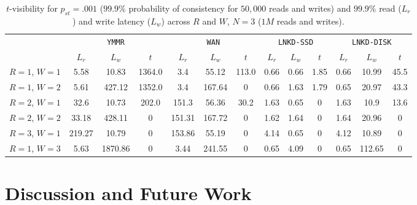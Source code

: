 \documentclass{vldb}
\newcommand{\sectionskip}{-0em}
\begin{document}
\begin{table}
\centering
\begin{tabular}{c|c|c|c|c|c|c|c|c|c|c|c|c|}
\cline{2-13}
& \multicolumn{3}{|c|}{\texttt{YMMR}} & \multicolumn{3}{|c|}{\texttt{WAN}} & \multicolumn{3}{|c|}{\texttt{LNKD-SSD}} & \multicolumn{3}{|c|}{\texttt{LNKD-DISK}}\\
&\multicolumn{1}{|c}{$L_r$}  & \multicolumn{1}{c}{$L_w$} & \multicolumn{1}{c|}{$t$} &  \multicolumn{1}{|c}{$L_r$} & \multicolumn{1}{c}{$L_w$} & \multicolumn{1}{c|}{$t$} &  \multicolumn{1}{|c}{$L_r$} & \multicolumn{1}{c}{$L_w$} & \multicolumn{1}{c|}{$t$} &  \multicolumn{1}{|c}{$L_r$} & \multicolumn{1}{c}{$L_w$} & \multicolumn{1}{c|}{$t$} \\\hline
\multicolumn{1}{|c|}{$R$$=$$1$, $W$$=$$1$}
& 5.58 & 10.83 & 1364.0 & 3.4 & 55.12 & 113.0 & 0.66 & 0.66 & 1.85 & 0.66 & 10.99 & 45.5 \\
\multicolumn{1}{|c|}{$R$$=$$1$, $W$$=$$2$}
& 5.61 & 427.12 & 1352.0 & 3.4 & 167.64 & 0 & 0.66 & 1.63 & 1.79 & 0.65 & 20.97 & 43.3 \\
\multicolumn{1}{|c|}{$R$$=$$2$, $W$$=$$1$}
& 32.6 & 10.73 & 202.0 & 151.3 & 56.36 & 30.2 & 1.63 & 0.65 & 0 & 1.63 & 10.9 & 13.6 \\
\multicolumn{1}{|c|}{$R$$=$$2$, $W$$=$$2$}
& 33.18 & 428.11 & 0 & 151.31 & 167.72 & 0 & 1.62 & 1.64 & 0 & 1.64 & 20.96 & 0 \\
\multicolumn{1}{|c|}{$R$$=$$3$, $W$$=$$1$}
& 219.27 & 10.79 & 0 & 153.86 & 55.19 & 0 & 4.14 & 0.65 & 0 & 4.12 & 10.89 & 0 \\
\multicolumn{1}{|c|}{$R$$=$$1$, $W$$=$$3$}
& 5.63 & 1870.86 & 0 & 3.44 & 241.55 & 0 & 0.65 & 4.09 & 0 & 0.65 & 112.65 & 0 \\
\hline
\end{tabular}
\vspace{-4pt}
\caption{$t$-visibility for $p_{st} = .001$ ($99.9\%$ probability
  of consistency for $50,000$ reads and writes) and $99.9\%$ read
  ($L_r$) and write latency ($L_w$) across $R$ and $W$, $N$$=$$3$
  ($1M$ reads and writes).}
\vspace{-12pt}
\label{table:lat-stale}
\end{table}


\vspace{\sectionskip}\section{Discussion and Future Work}
\label{sec:discussion}
\end{document}
